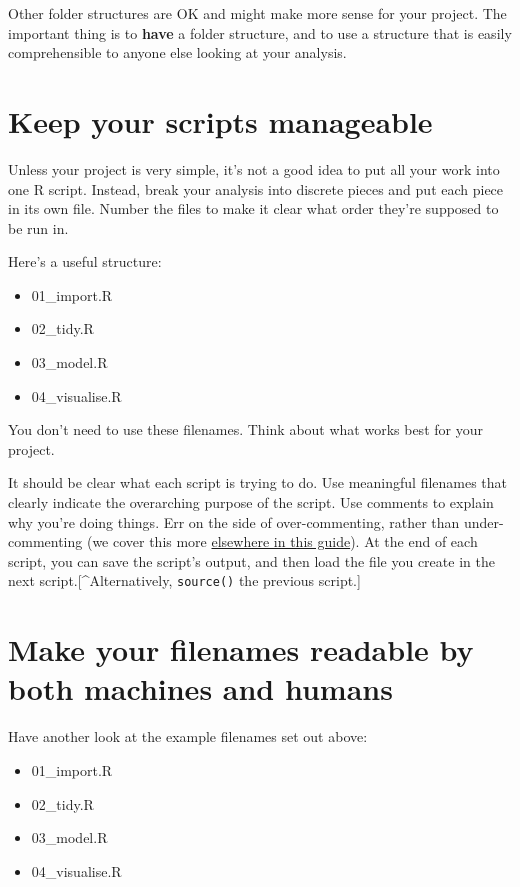 \documentclass[
]{book}
\providecommand{\tightlist}{%
  \setlength{\itemsep}{0pt}\setlength{\parskip}{0pt}}
\begin{document}
Other folder structures are OK and might make more sense for your project. The important thing is to \textbf{have} a folder structure, and to use a structure that is easily comprehensible to anyone else looking at your analysis.

\hypertarget{manageable}{%
\section{Keep your scripts manageable}\label{manageable}}

Unless your project is very simple, it's not a good idea to put all your work into one R script. Instead, break your analysis into discrete pieces and put each piece in its own file. Number the files to make it clear what order they're supposed to be run in.

Here's a useful structure:

\begin{itemize}
\tightlist
\item
  01\_import.R
\item
  02\_tidy.R
\item
  03\_model.R
\item
  04\_visualise.R
\end{itemize}

You don't need to use these filenames. Think about what works best for your project.

It should be clear what each script is trying to do. Use meaningful filenames that clearly indicate the overarching purpose of the script. Use comments to explain why you're doing things. Err on the side of over-commenting, rather than under-commenting (we cover this more \protect\hyperlink{use-comments}{elsewhere in this guide}). At the end of each script, you can save the script's output, and then load the file you create in the next script.{[}\^{}Alternatively, \texttt{source()} the previous script.{]}

\hypertarget{make-your-filenames-readable-by-both-machines-and-humans}{%
\section{Make your filenames readable by both machines and humans}\label{make-your-filenames-readable-by-both-machines-and-humans}}

Have another look at the example filenames set out above:

\begin{itemize}
\tightlist
\item
  01\_import.R
\item
  02\_tidy.R
\item
  03\_model.R
\item
  04\_visualise.R
\end{itemize}
\end{document}
